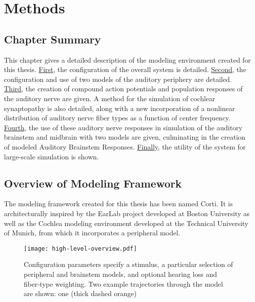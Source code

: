 \chapter{Methods}
\label{chapter:Methods}
\thispagestyle{myheadings}

\graphicspath{{4_Methods/Figures/}}

\section{Chapter Summary} %
\label{sec:methodsummary}
This chapter gives a detailed description of the modeling environment created for this thesis.  \hyperref[sec:overview_of_modeling_framework]{First}, the configuration of the overall system is detailed.  \hyperref[sec:peripheral_models]{Second}, the configuration and use of two models of the auditory periphery are detailed.  \hyperref[sec:auditory_nerve_response_models]{Third}, the creation of compound action potentials and population responses of the auditory nerve are given.  A method for the simulation of cochlear synaptopathy is also detailed, along with a new incorporation of a nonlinear distribution of auditory nerve fiber types as a function of center frequency.  \hyperref[sec:brainstem_models]{Fourth}, the use of these auditory nerve responses in simulation of the auditory brainstem and midbrain with two models are given, culminating in the creation of modeled Auditory Brainstem Responses.  \hyperref[sub:automated_parameter_exploration]{Finally}, the utility of the system for large-scale simulation is shown. 

\section{Overview of Modeling Framework} %
\label{sec:overview_of_modeling_framework}
The modeling framework created for this thesis has been named Corti\citep{Voysey2016Corti}. It is architecturally inspired by the EarLab project developed at Boston University as well as the Cochlea\citep{Rudnicki2014Cochlea} modeling environment developed at the Technical University of Munich, from which it incorporates a peripheral model. 

\begin{figure}[htbp]
	\centering
	\texttt{[image: high-level-overview.pdf]}
	\caption[Overview of the Corti modeling environment.]{Configuration parameters specify a stimulus, a particular selection of peripheral and brainstem models, and optional hearing loss and fiber-type weighting.  Two example trajectories through the model are shown: one (thick dashed orange) }
	\label{fig:corti-overview}
	\end{figure}

